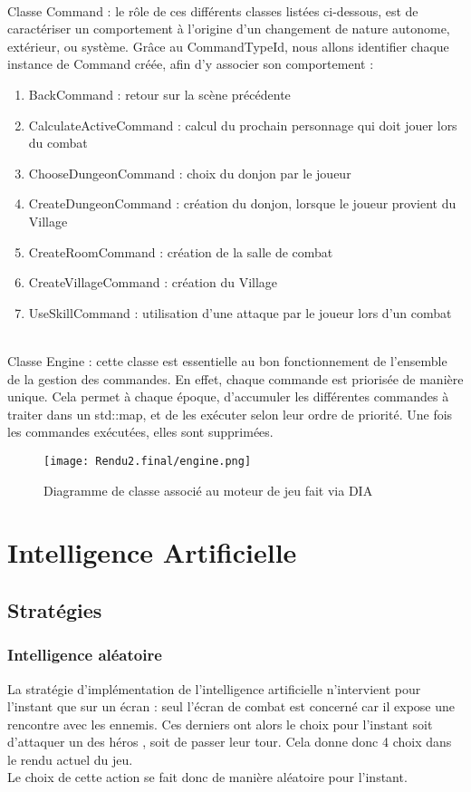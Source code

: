 \documentclass[a4paper,12pt]{article}
\begin{document}
\\ \indent Classe Command : le rôle de ces différents classes listées ci-dessous, est de caractériser un comportement à l'origine d'un changement de nature autonome, extérieur, ou système. Grâce au CommandTypeId, nous allons identifier chaque instance de Command créée, afin d'y associer son comportement : 
\begin{enumerate}
    \item BackCommand : retour sur la scène précédente
    \item CalculateActiveCommand : calcul du prochain personnage qui doit jouer lors du combat 
    \item ChooseDungeonCommand : choix du donjon par le joueur
    \item CreateDungeonCommand : création du donjon, lorsque le joueur provient du Village
    \item CreateRoomCommand : création de la salle de combat 
    \item CreateVillageCommand : création du Village
    \item UseSkillCommand : utilisation d'une attaque par le joueur lors d'un combat
\end{enumerate}

\\ \indent Classe Engine : cette classe est essentielle au bon fonctionnement de l'ensemble de la gestion des commandes. En effet, chaque commande est priorisée de manière unique. Cela permet à chaque époque, d'accumuler les différentes commandes à traiter dans un std::map, et de les exécuter selon leur ordre de priorité. Une fois les commandes exécutées, elles sont supprimées.

\begin{figure}[!ht]
  \centering
  \texttt{[image: Rendu2.final/engine.png]}
  \caption{Diagramme de classe associé au moteur de jeu fait via DIA}
\end{figure}

\clearpage
\newpage
\section{Intelligence Artificielle}
\subsection{Stratégies}
\subsubsection{Intelligence aléatoire}
La stratégie d'implémentation de l'intelligence artificielle n'intervient pour l'instant que sur un écran : seul l'écran de combat est concerné car il expose une rencontre avec les ennemis. Ces derniers ont alors le choix pour l'instant soit d'attaquer un des héros , soit de passer leur tour. Cela donne donc 4 choix dans le rendu actuel du jeu.
\\ \indent Le choix de cette action se fait donc de manière aléatoire pour l'instant.
\end{document}
